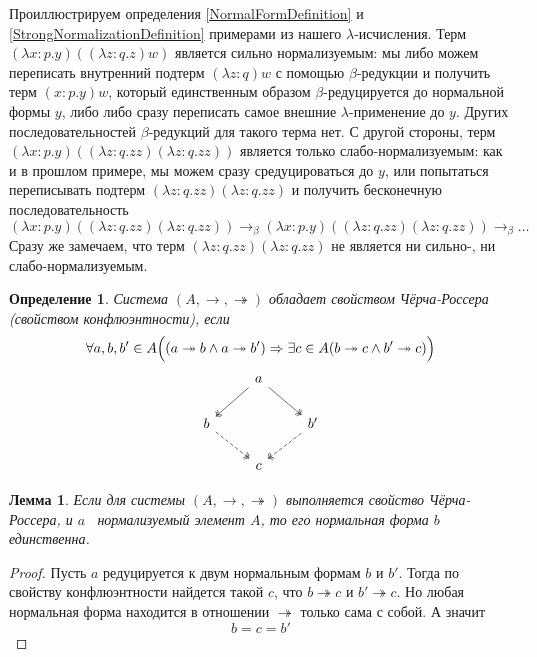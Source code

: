 \documentclass{article}[12pt]
\newtheorem{lemma}{Лемма}
\newtheorem{definition}{Определение}
\newcommand{\dash}{\textemdash\ }
\begin{document}
Проиллюстрируем определения \ref{NormalFormDefinition} и \ref{StrongNormalizationDefinition} примерами из
нашего $\lambda$-исчисления. Терм $(\lambda x : p . y)((\lambda z : q . z) w)$ является сильно нормализуемым:
мы либо можем переписать внутренний подтерм $(\lambda z : q) w$ с помощью $\beta$-редукции и получить
терм $(x : p . y) w$, который единственным образом $\beta$-редуцируется до нормальной формы $y$, либо
либо сразу переписать самое внешние $\lambda$-применение до $y$. Других последовательностей $\beta$-редукций
для такого терма нет. С другой стороны, терм $(\lambda x : p . y)((\lambda z : q . zz)(\lambda z : q . zz))$
является только слабо-нормализуемым: как и в прошлом примере, мы можем сразу средуцироваться до $y$,
или попытаться переписывать подтерм $(\lambda z : q . zz)(\lambda z : q . zz)$ и получить бесконечную последовательность
$$(\lambda x : p . y)((\lambda z : q . zz)(\lambda z : q . zz)) \rightarrow_\beta (\lambda x : p . y)((\lambda z : q . zz)(\lambda z : q . zz)) \rightarrow_\beta \dots$$
Сразу же замечаем, что терм $(\lambda z : q . zz)(\lambda z : q . zz)$ не является ни сильно-,
ни слабо-нормализуемым.

\begin{definition}
    \label{ChurchRosserDefinition}
    Система $(A, \rightarrow, \twoheadrightarrow)$ обладает свойством Чёрча-Россера (свойством конфлюэнтности),
    если 
    $$\forall a, b, b' \in A \Bigl((a \twoheadrightarrow b \land a \twoheadrightarrow b') \Rightarrow \exists c \in A (b \twoheadrightarrow c \land b' \twoheadrightarrow c) \Bigr)$$
    $$
    \begin{tikzcd}
        & \arrow[ld, two heads] a \arrow[rd, two heads] & \\
        b \arrow[rd, two heads, dashed] & & \arrow[ld, two heads, dashed] b' \\
        & c &
    \end{tikzcd}
    $$
\end{definition}

\begin{lemma}
    \label{UniqueNormalFormLemma}
    Если для системы $(A, \rightarrow, \twoheadrightarrow)$ выполняется свойство Чёрча-Россера, и
    $a$ \dash нормализуемый элемент $A$, то его нормальная форма $b$ единственна.
\end{lemma}
\begin{proof}
    Пусть $a$ редуцируется к двум нормальным формам $b$ и $b'$. Тогда по свойству
    конфлюэнтности найдется такой $c$, что $b \twoheadrightarrow c$ и $b' \twoheadrightarrow c$. Но
    любая нормальная форма находится в отношении $\twoheadrightarrow$ только сама с собой.
    А значит
    $$b = c = b'$$
\end{proof}
\end{document}
